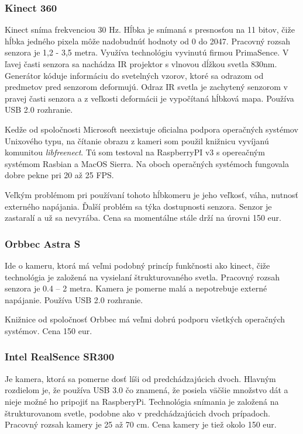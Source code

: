 \subsubsection{Kinect 360}
Kinect sníma frekvenciou 30 Hz. Hĺbka je snímaná s presnosťou na 11 bitov, čiže hĺbka jedného pixela môže nadobudnúť hodnoty od 0 do 2047.  Pracovný rozsah senzora je  1,2 - 3,5 metra.  Využíva technológiu vyvinutú firmou PrimaSence. V ľavej časti senzora sa nachádza IR projektor s vlnovou dĺžkou svetla 830nm. Generátor kóduje informáciu do svetelných vzorov, ktoré sa odrazom od predmetov pred senzorom deformujú. Odraz IR svetla je zachytený senzorom v pravej časti senzora a z veľkosti deformácii je vypočítaná hĺbková mapa. Používa USB 2.0 rozhranie. 

Kedže od spoločnosti Microsoft neexistuje oficialna podpora operačných systémov Unixového typu, na čítanie obrazu z kameri som použil knižnicu vyvíjanú komunitou \textit{libfreenect}. Tú som testoval na RaspberryPI v3 s opereačným systémom Rasbian a MacOS Sierra. Na oboch operačných systémoch fungovala dobre pekne pri 20 až 25 FPS. 

Veľkým problémom pri používaní tohoto hĺbkomeru je jeho veľkosť, váha, nutnosť externého napájania. Ďalší problém sa týka dostupnosti senzora. Senzor je zastaralí a už sa nevyrába. Cena sa momentálne stále drží na úrovni 150 eur. 

\subsubsection{Orbbec Astra S}
Ide o kameru, ktorá má veľmi podobný princíp funkčnosti ako kinect, čiže technológia je založená na vysielaní štrukturovaného svetla. Pracovný rozsah senzora je 0.4 – 2 metra. Kamera je pomerne malá a nepotrebuje externé napájanie. Používa USB 2.0 rozhranie. 

Knižnice od spoločnosť Orbbec má veľmi dobrú podporu všetkých operačných systémov. Cena 150 eur. 


\subsubsection{Intel RealSence SR300}
Je kamera, ktorá sa pomerne dosť líši od predchádzajúcich dvoch. Hlavným rozdielom je, že používa USB 3.0 čo znamená, že posiela väčšie množstvo dát a nieje možné ho pripojiť na RaspberyPi. Technológia snímania je založená na štrukturovanom svetle, podobne ako v predchádzajúcich dvoch prípadoch. Pracovný rozsah kamery je 25 až 70 cm. Cena kamery je tiež okolo 150 eur. 

